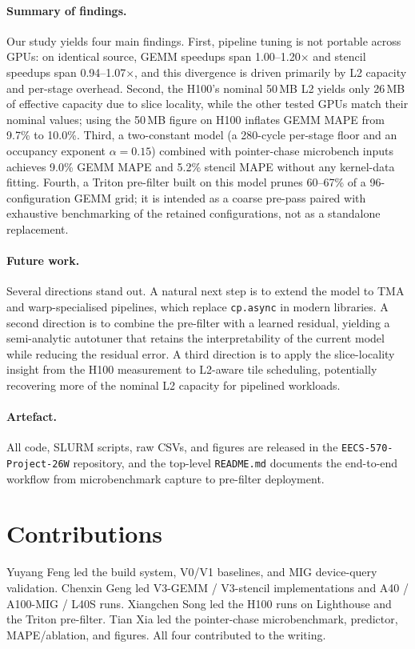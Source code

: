 \documentclass[10pt,twocolumn]{article}
\newcommand{\cpasync}{\texttt{cp.async}}
\begin{document}
\paragraph{Summary of findings.}
Our study yields four main findings.  First, pipeline tuning is not
portable across GPUs: on identical source, GEMM speedups span
1.00--1.20$\times$ and stencil speedups span 0.94--1.07$\times$,
and this divergence is driven primarily by L2 capacity and
per-stage overhead.  Second, the H100's nominal 50\,MB L2 yields
only 26\,MB of effective capacity due to slice locality, while the
other tested GPUs match their nominal values; using the 50\,MB
figure on H100 inflates GEMM MAPE from 9.7\% to 10.0\%.  Third, a
two-constant model (a 280-cycle per-stage floor and an occupancy
exponent $\alpha{=}0.15$) combined with pointer-chase microbench
inputs achieves 9.0\% GEMM MAPE and 5.2\% stencil MAPE without any
kernel-data fitting.  Fourth, a Triton pre-filter built on this
model prunes 60--67\% of a 96-configuration GEMM grid; it is
intended as a coarse pre-pass paired with exhaustive benchmarking
of the retained configurations, not as a standalone replacement.

\paragraph{Future work.}
Several directions stand out.  A natural next step is to extend the
model to TMA and warp-specialised pipelines, which replace
\cpasync{} in modern libraries.  A second direction is to combine
the pre-filter with a learned residual, yielding a semi-analytic
autotuner that retains the interpretability of the current model
while reducing the residual error.  A third direction is to apply
the slice-locality insight from the H100 measurement to L2-aware
tile scheduling, potentially recovering more of the nominal L2
capacity for pipelined workloads.

\paragraph{Artefact.}
All code, SLURM scripts, raw CSVs, and figures are released in the
\texttt{EECS-570-Project-26W} repository, and the top-level
\texttt{README.md} documents the end-to-end workflow from
microbenchmark capture to pre-filter deployment.

\section*{Contributions}
\small
Yuyang Feng led the build system, V0/V1 baselines, and MIG
device-query validation.  Chenxin Geng led V3-GEMM / V3-stencil
implementations and A40 / A100-MIG / L40S runs.  Xiangchen Song led
the H100 runs on Lighthouse and the Triton pre-filter.  Tian Xia
led the pointer-chase microbenchmark, predictor, MAPE/ablation, and
figures.  All four contributed to the writing.
\end{document}
